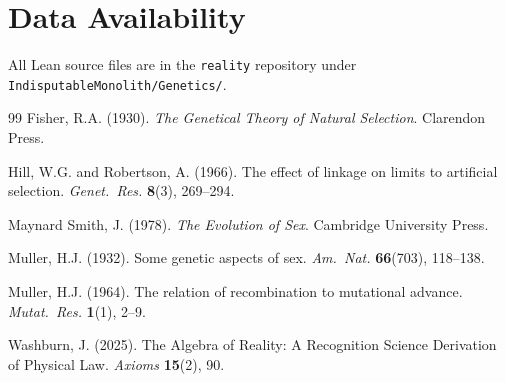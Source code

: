 \documentclass[11pt,twocolumn]{article}
\begin{document}
\section*{Data Availability}

All Lean source files are in the \texttt{reality} repository under
\texttt{IndisputableMonolith/Genetics/}.

\begin{thebibliography}{99}
Fisher, R.A. (1930). \textit{The Genetical Theory of Natural Selection}.
Clarendon Press.

Hill, W.G. and Robertson, A. (1966). The effect of linkage on limits to
artificial selection. \textit{Genet.~Res.} \textbf{8}(3), 269--294.

Maynard Smith, J. (1978). \textit{The Evolution of Sex}. Cambridge
University Press.

Muller, H.J. (1932). Some genetic aspects of sex.
\textit{Am.~Nat.} \textbf{66}(703), 118--138.

Muller, H.J. (1964). The relation of recombination to mutational advance.
\textit{Mutat.~Res.} \textbf{1}(1), 2--9.

Washburn, J. (2025). The Algebra of Reality: A Recognition Science
Derivation of Physical Law. \textit{Axioms} \textbf{15}(2), 90.
\end{thebibliography}
\end{document}
